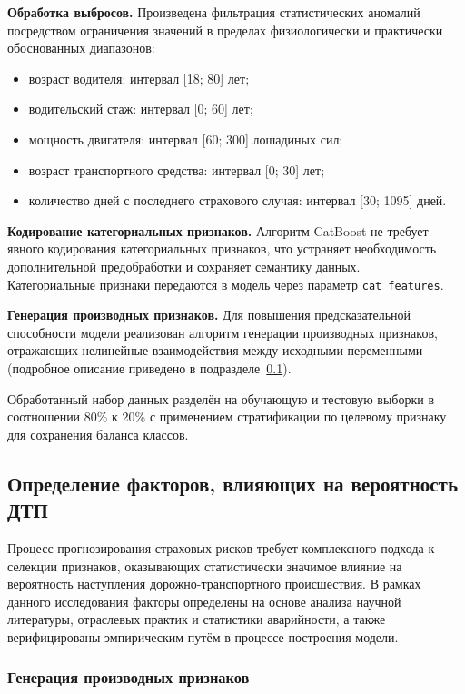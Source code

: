 \textbf{Обработка выбросов.} Произведена фильтрация статистических аномалий посредством ограничения значений в пределах физиологически и практически обоснованных диапазонов:
\begin{itemize}
    \item возраст водителя: интервал [18; 80] лет;
    \item водительский стаж: интервал [0; 60] лет;
    \item мощность двигателя: интервал [60; 300] лошадиных сил;
    \item возраст транспортного средства: интервал [0; 30] лет;
    \item количество дней с последнего страхового случая: интервал [30; 1095] дней.
\end{itemize}

\textbf{Кодирование категориальных признаков.} Алгоритм CatBoost не требует явного кодирования категориальных признаков, что устраняет необходимость дополнительной предобработки и сохраняет семантику данных. \\ Категориальные признаки передаются в модель через параметр \texttt{cat\_features}.

\textbf{Генерация производных признаков.} Для повышения предсказательной способности модели реализован алгоритм генерации производных признаков, отражающих нелинейные взаимодействия между исходными переменными (подробное описание приведено в подразделе~\ref{subsec:feature_engineering}).

Обработанный набор данных разделён на обучающую и тестовую выборки в соотношении 80\% к 20\% с применением стратификации по целевому признаку для сохранения баланса классов.


\subsection{Определение факторов, влияющих на вероятность ДТП}
\label{subsec:feature_engineering}

Процесс прогнозирования страховых рисков требует комплексного подхода к селекции признаков, оказывающих статистически значимое влияние на вероятность наступления дорожно-транспортного происшествия. В рамках данного исследования факторы определены на основе анализа научной литературы, отраслевых практик и статистики аварийности, а также верифицированы эмпирическим путём в процессе построения модели.

\subsubsection{Генерация производных признаков}

